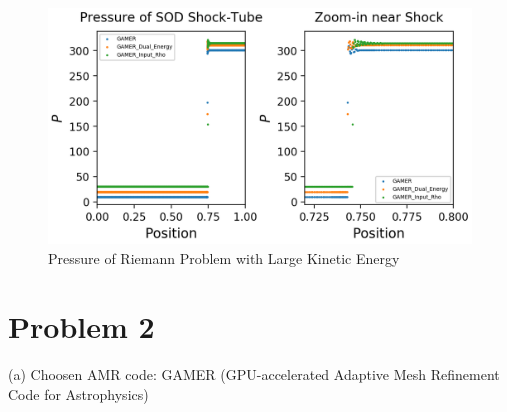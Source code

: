 \documentclass[a4paper,10pt]{article}
\begin{document}
\begin{figure}[htbp] %
\centering %
\includegraphics[width=15cm]{pressure_1-2.png} %
\caption{Pressure of Riemann Problem with Large Kinetic Energy}
\end{figure}
\newpage
\section*{Problem 2}
\setlength{\parindent}{0em}(a) Choosen AMR code: GAMER (GPU-accelerated Adaptive Mesh Refinement Code for Astrophysics)
\end{document}
